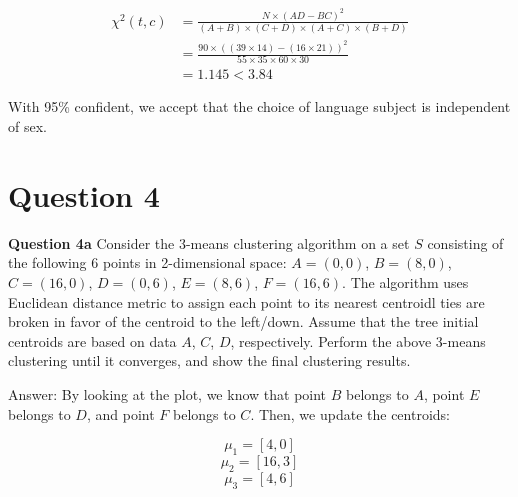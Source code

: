 \documentclass[11pt,a4paper]{report}
\begin{document}
\begin{multicols*}{2}
\begin{equation*}
\begin{split}
   \chi^2(t,c) &= \frac{N\times (AD - BC)^2}{(A+B) \times (C+D) \times (A+C) \times (B+D)} \\
   &= \frac{90\times ((39 \times 14) - (16 \times 21))^2}{55\times 35 \times 60 \times 30}\\
   &= 1.145 < 3.84
\end{split}
\end{equation*}

\noindent With 95\% confident, we accept that the choice of language subject is independent of sex. 

\section{Question 4}

\noindent \textbf{Question 4a} Consider the 3-means clustering algorithm on a set $S$ consisting of the following 6 points in 2-dimensional space: $A=(0,0)$, $B=(8,0)$, $C=(16,0)$, $D=(0,6)$, $E=(8,6)$, $F=(16,6)$. The algorithm uses Euclidean distance metric to assign each point to its nearest centroidl ties are broken in favor of the centroid to the left/down. Assume that the tree initial centroids are based on data $A$, $C$, $D$, respectively. Perform the above 3-means clustering until it converges, and show the final clustering results.


\noindent Answer: By looking at the plot, we know that point $B$ belongs to $A$, point $E$ belongs to $D$, and point $F$ belongs to $C$. Then, we update the centroids:

$$\mu_1 = [4,0]$$
$$\mu_2 = [16,3]$$
$$\mu_3 = [4,6]$$



\end{multicols*}
\end{document}
